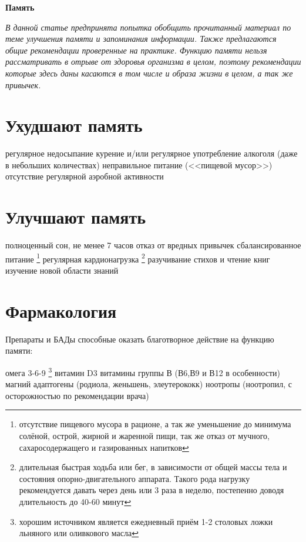 \documentclass[12pt]{article}			%
\begin{document}
\begin{center}
	\Huge{\textbf{Память}}
\end{center}

\hfill

\noindent
\textit{В данной статье предпринята попытка обобщить прочитанный материал по теме улучшения памяти и запоминания информации. Также предлагаются общие рекомендации проверенные на практике. Функцию памяти нельзя рассматривать в отрыве от здоровья организма в целом, поэтому рекомендации которые здесь даны касаются в том числе и образа жизни в целом, а так же привычек.}

\hfill
	
\section{Ухудшают память}
\begin{outline}[itemize]
	\1 регулярное недосыпание
	\1 курение и/или регулярное употребление алкоголя (даже в небольших количествах)
	\1 неправильное питание (<<пищевой мусор>>)
	\1 отсутствие регулярной аэробной активности
\end{outline}

\section{Улучшают память}
\begin{outline}[itemize]
	\1 полноценный сон, не менее 7 часов
	\1 отказ от вредных привычек
	\1 сбалансированное питание \footnote{отсутствие пищевого мусора в рационе, а так же уменьшение до минимума солёной, острой, жирной и жаренной пищи, так же отказ от мучного, сахаросодержащего и газированных напитков}
	\1 регулярная кардионагрузка \footnote{длительная быстрая ходьба или бег, в зависимости от общей массы тела и состояния опорно-двигательного аппарата. Такого рода нагрузку рекомендуется давать через день или 3 раза в неделю, постепенно доводя длительность до 40-60 минут}
	\1 разучивание стихов и чтение книг
	\1 изучение новой области знаний
\end{outline}

\section{Фармакология}
Препараты и БАДы способные оказать благотворное действие на функцию памяти:
\begin{outline}[itemize]
	\1 омега 3-6-9 \footnote{хорошим источником является ежедневный приём 1-2 столовых ложки льняного или оливкового масла}
	\1 витамин D3
	\1 витамины группы В (В6,В9 и В12 в особенности)
	\1 магний
	\1 адаптогены (родиола, женьшень, элеутерококк)
	\1 ноотропы (ноотропил, с осторожностью по рекомендации врача)
\end{outline}
	
\end{document}
